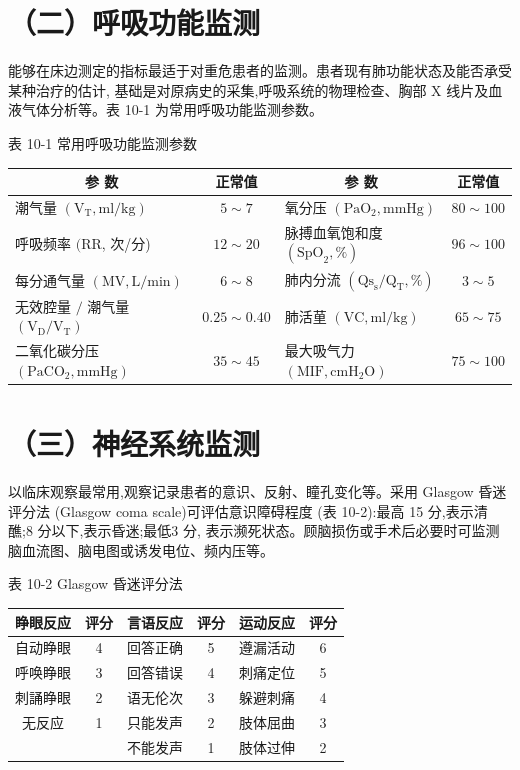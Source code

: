 \documentclass[10pt]{article}
\begin{document}
\section*{（二）呼吸功能监测}
能够在床边测定的指标最适于对重危患者的监测。患者现有肺功能状态及能否承受某种治疗的估计, 基础是对原病史的采集,呼吸系统的物理检查、胸部 X 线片及血液气体分析等。表 10-1 为常用呼吸功能监测参数。

表 10-1 常用呼吸功能监测参数

\begin{center}
\begin{tabular}{lc||lc}
\hline
\multicolumn{1}{c|}{参 数} & 正常值 & \multicolumn{1}{c}{参 数} & 正常值 \\
\hline
潮气量 $\left(\mathrm{V}_{\mathrm{T}}, \mathrm{ml} / \mathrm{kg}\right)$ & $5 \sim 7$ & 氧分压 $\left(\mathrm{PaO}_{2}, \mathrm{mmHg}\right)$ & $80 \sim 100$ \\
呼吸频率 $(\mathrm{RR}$, 次/分) & $12 \sim 20$ & 脉搏血氧饱和度 $\left(\mathrm{SpO}_{2}, \%\right)$ & $96 \sim 100$ \\
每分通气量 $(\mathrm{MV}, \mathrm{L} / \mathrm{min})$ & $6 \sim 8$ & 肺内分流 $\left(\mathrm{Qs}_{\mathrm{s}} / \mathrm{Q}_{\mathrm{T}}, \%\right)$ & $3 \sim 5$ \\
无效腔量 $/$ 潮气量 $\left(\mathrm{V}_{\mathrm{D}} / \mathrm{V}_{\mathrm{T}}\right)$ & $0.25 \sim 0.40$ & 肺活荲 $(\mathrm{VC}, \mathrm{ml} / \mathrm{kg})$ & $65 \sim 75$ \\
二氧化碳分压 $\left(\mathrm{PaCO}_{2}, \mathrm{mmHg}\right)$ & $35 \sim 45$ & 最大吸气力 $\left(\mathrm{MIF}, \mathrm{cmH}_{2} \mathrm{O}\right)$ & $75 \sim 100$ \\
\hline
\end{tabular}
\end{center}

\section*{（三）神经系统监测}
以临床观察最常用,观察记录患者的意识、反射、瞳孔变化等。采用 Glasgow 昏迷评分法 (Glasgow coma scale)可评估意识障碍程度 (表 10-2):最高 15 分,表示清醮;8 分以下,表示昏迷;最低3 分, 表示濒死状态。顾脑损伤或手术后必要时可监测脑血流图、脑电图或诱发电位、频内压等。

表 10-2 Glasgow 昏迷评分法

\begin{center}
\begin{tabular}{cc||cc||lc}
\hline
睁眼反应 & 评分 & 言语反应 & 评分 & 运动反应 & 评分 \\
\hline
自动睁眼 & 4 & 回答正确 & 5 & 遵漏活动 & 6 \\
呼唤睁眼 & 3 & 回答错误 & 4 & 刺痛定位 & 5 \\
刺誦睁眼 & 2 & 语无伦次 & 3 & 躲避刺痛 & 4 \\
无反应 & 1 & 只能发声 & 2 & 肢体屈曲 & 3 \\
 &  & 不能发声 & 1 & 肢体过伸 & 2 \\
\hline
\end{tabular}
\end{center}
\end{document}
